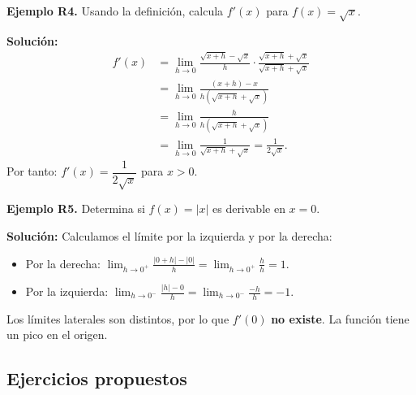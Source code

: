 \documentclass[12pt, a4paper]{article}
\begin{document}
\textbf{Ejemplo R4.} Usando la definición, calcula $f'(x)$ para $f(x) = \sqrt{x}$.

\begin{cuadrosolucion}
  \textbf{Solución:}
  \begin{align*}
    f'(x) & = \lim_{h \to 0} \frac{\sqrt{x + h} - \sqrt{x}}{h} \cdot \frac{\sqrt{x + h} + \sqrt{x}}{\sqrt{x + h} + \sqrt{x}} \\
          & = \lim_{h \to 0} \frac{(x + h) - x}{h(\sqrt{x + h} + \sqrt{x})}                                                  \\
          & = \lim_{h \to 0} \frac{h}{h(\sqrt{x + h} + \sqrt{x})}                                                            \\
          & = \lim_{h \to 0} \frac{1}{\sqrt{x + h} + \sqrt{x}} = \frac{1}{2\sqrt{x}}.
  \end{align*}
  Por tanto: $f'(x) = \dfrac{1}{2\sqrt{x}}$ para $x > 0$.
\end{cuadrosolucion}

\textbf{Ejemplo R5.} Determina si $f(x) = |x|$ es derivable en $x = 0$.

\begin{cuadrosolucion}
  \textbf{Solución:} Calculamos el límite por la izquierda y por la derecha:
  \begin{itemize}
    \item Por la derecha: $\lim_{h \to 0^+} \frac{|0 + h| - |0|}{h} = \lim_{h \to 0^+} \frac{h}{h} = 1$.
    \item Por la izquierda: $\lim_{h \to 0^-} \frac{|h| - 0}{h} = \lim_{h \to 0^-} \frac{-h}{h} = -1$.
  \end{itemize}
  Los límites laterales son distintos, por lo que $f'(0)$ \textbf{no existe}. La función tiene un pico en el origen.
\end{cuadrosolucion}

\newpage

\subsection{Ejercicios propuestos}
\end{document}
